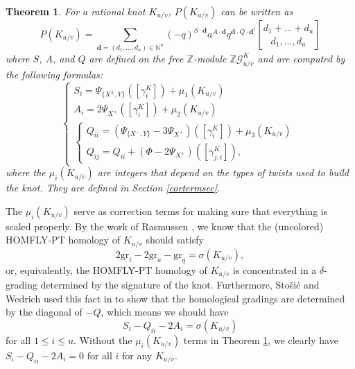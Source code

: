 \documentclass[11pt]{amsart}
\theoremstyle{plain}
\newtheorem{theoremN}{Theorem}[section]
\theoremstyle{definition}
\theoremstyle{remark}
\begin{document}
\begin{theoremN}
\label{Knotsthm}
    For a rational knot $K_{u/v}$, $P(K_{u/v})$ can be written as
    \begin{equation}
        P(K_{u/v})=\sum_{\textbf{d}=(d_1,...,d_u)\in \mathbb{N}^u}(-q)^{S\cdot \textbf{d}}a^{A\cdot \textbf{d}}q^{\textbf{d} \cdot Q\cdot \textbf{d}^t} {d_1+...+d_u\brack d_1,...,d_u}
    \end{equation}
    where $S$, $A$, and $Q$ are defined on the free $\mathbb{Z}$-module $\mathbb{Z}\mathcal{G}_{u/v}^K$ and are computed by the following formulas:
    \[
    \begin{cases}
        S_i=\Psi_{\{X^\pm,Y\}}([\gamma_i^K])+\mu_1(K_{u/v})\\
        A_i=2\Psi_{X^+}([\gamma_i^K])+\mu_2(K_{u/v})\\
        \begin{cases}
            Q_{ii}=(\Psi_{\{X^-,Y\}}-3\Psi_{X^+})([\gamma_i^K])+\mu_3(K_{u/v})\\
            Q_{ij}=Q_{ii}+(\Phi-2\Psi_{X^+})([\gamma_{j,i}^K]),
        \end{cases}
    \end{cases}
    \]
    where the $\mu_i(K_{u/v})$ are integers that depend on the types of twists used to build the knot. They are defined in Section \ref{cortermsec}.
\end{theoremN}

The $\mu_i(K_{u/v})$ serve as correction terms for making sure that everything is scaled properly. By the work of Rasmussen \cite{R15}, we know that the (uncolored) HOMFLY-PT homology of $K_{u/v}$ should satisfy
\begin{equation}
\label{deltaeq1}
2\text{gr}_t-2\text{gr}_{a}-\text{gr}_q=\sigma(K_{u/v}),
\end{equation}
or, equivalently, the HOMFLY-PT homology of $K_{u/v}$ is concentrated in a $\delta$-grading determined by the signature of the knot. Furthermore, Sto\v si\'c and Wedrich used this fact in \cite{SW21} to show that the homological gradings are determined by the diagonal of $-Q$, which means we should have
\begin{equation}
\label{deltaeq2}
S_i-Q_{ii}-2A_i=\sigma(K_{u/v})
\end{equation}
for all $1\leq i\leq u$. Without the $\mu_i(K_{u/v})$ terms in Theorem \ref{Knotsthm}, we clearly have $S_i-Q_{ii}-2A_i=0$ for all $i$ for any $K_{u/v}$.
\end{document}
